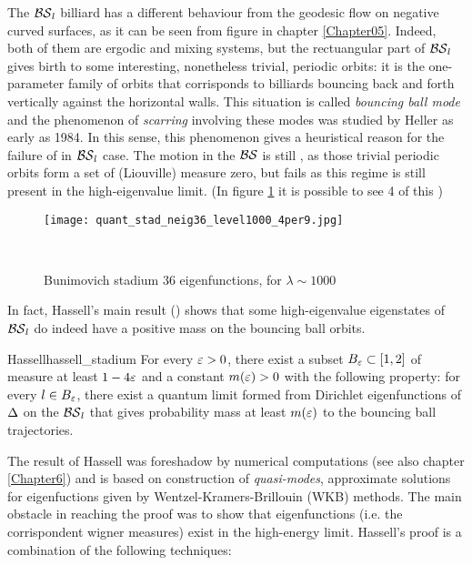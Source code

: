The $\operatorname{\mathcal{BS}}_{l}$ billiard has a different behaviour from the geodesic flow on negative curved surfaces, as it can be seen from figure in chapter \ref{Chapter05}. Indeed, both of them are ergodic and mixing systems, but the rectuangular part of $\operatorname{\mathcal{BS}}_{l}$ gives birth to some interesting, nonetheless trivial, periodic orbits: it is the one-parameter family of orbits that corrisponds to billiards bouncing back and forth vertically against the horizontal walls.
This situation is called \emph{bouncing ball mode} and the phenomenon of \emph{scarring} involving these modes was studied by Heller as early as 1984. In this sense, this phenomenon gives a heuristical reason for the failure of \QUE in $\operatorname{\mathcal{BS}}_{l}$ case. The motion in the $\operatorname{\mathcal{BS}}$ is still \QE, as those trivial periodic orbits form a set of (Liouville) measure zero, but \QUE fails as this regime is still present in the high-eigenvalue limit. (In figure \ref{fig:bunimov_eigenstates} it is possible to see 4 of this )
\begin{figure}[h]
\centering

    \texttt{[image: quant\_stad\_neig36\_level1000\_4per9.jpg]}

    \noindent\\
  \decoRule
  \caption{Bunimovich stadium 36 eigenfunctions, for $\lambda\sim1000$}
  \label{fig:bunimov_eigenstates}
\end{figure}

 In fact, Hassell's main result (\cite{Hass:billiards_not}) shows that some high-eigenvalue eigenstates of $\operatorname{\mathcal{BS}}_{l}$ do indeed have a positive mass on the bouncing ball orbits.

\begin{impTeo}{Hassell}{hassell_stadium}
For every $\varepsilon>0$, there exist a subset $B_{\varepsilon}\subset[1,2]$ of measure at least $1-4\varepsilon$ and a constant $m(\varepsilon)>0$ with the following property: for every $l\in B_{\varepsilon}$, there exist a quantum limit formed from Dirichlet eigenfunctions of $\operatorname{\Delta}$ on the $\operatorname{\mathcal{BS}}_{l}$ that gives probability mass at least $m(\varepsilon)$ to the bouncing ball trajectories.
\end{impTeo}


The result of Hassell was foreshadow by numerical computations (see also chapter \ref{Chapter6}) and is based on construction of \emph{quasi-modes}, approximate solutions for
eigenfuctions given by Wentzel-Kramers-Brillouin (WKB) methods. The main obstacle in reaching the proof was to show that  eigenfunctions (i.e. the corrispondent wigner measures) exist in the high-energy limit. Hassell's proof is a combination of the following techniques:


